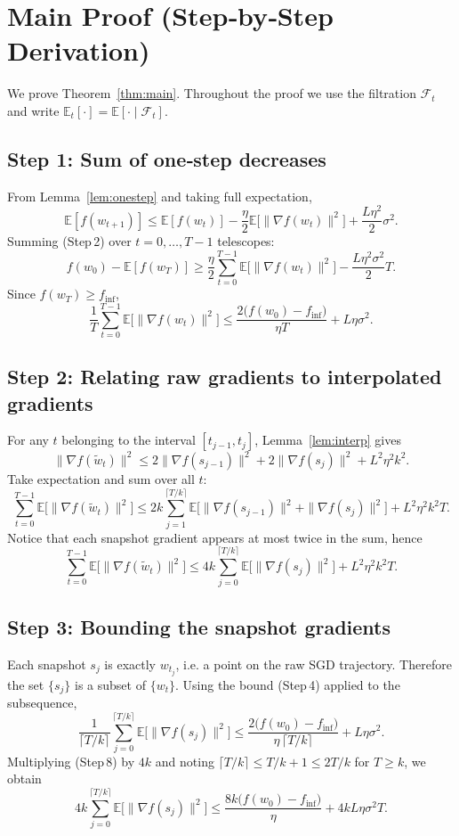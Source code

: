 \documentclass{article}
\newcommand{\E}{\mathbb{E}}
\theoremstyle{definition}
\begin{document}
\section*{Main Proof (Step‑by‑Step Derivation)}
We prove Theorem~\ref{thm:main}.  Throughout the proof we use the filtration
$\mathcal{F}_t$ and write $\E_t[\cdot]=\E[\cdot\mid\mathcal{F}_t]$.

\subsection*{Step 1: Sum of one‑step decreases}
From Lemma~\ref{lem:onestep} and taking full expectation,
\[
\E[f(w_{t+1})]\le \E[f(w_t)]-\frac{\eta}{2}\E\!\big[\|\nabla f(w_t)\|^{2}\big]
+\frac{L\eta^{2}}{2}\sigma^{2}.
\tag{[Step 2]}
\]
Summing (Step 2) over $t=0,\dots,T-1$ telescopes:
\[
f(w_0)-\E[f(w_T)]
\ge \frac{\eta}{2}\sum_{t=0}^{T-1}\E\!\big[\|\nabla f(w_t)\|^{2}\big]
-\frac{L\eta^{2}\sigma^{2}}{2}T .
\tag{[Step 3]}
\]
Since $f(w_T)\ge f_{\inf}$,
\[
\frac{1}{T}\sum_{t=0}^{T-1}\E\!\big[\|\nabla f(w_t)\|^{2}\big]
\le \frac{2\big(f(w_0)-f_{\inf}\big)}{\eta T}
+L\eta\sigma^{2}.
\tag{[Step 4]}
\]

\subsection*{Step 2: Relating raw gradients to interpolated gradients}
For any $t$ belonging to the interval $[t_{j-1},t_j]$, Lemma~\ref{lem:interp}
gives
\[
\|\nabla f(\tilde w_t)\|^{2}
\le 2\|\nabla f(s_{j-1})\|^{2}+2\|\nabla f(s_{j})\|^{2}
+L^{2}\eta^{2}k^{2}.
\tag{[Step 5]}
\]
Take expectation and sum over all $t$:
\[
\sum_{t=0}^{T-1}\E\!\big[\|\nabla f(\tilde w_t)\|^{2}\big]
\le
2k\sum_{j=1}^{\lceil T/k\rceil}\E\!\big[\|\nabla f(s_{j-1})\|^{2}
+\|\nabla f(s_{j})\|^{2}\big]
+L^{2}\eta^{2}k^{2}T .
\tag{[Step 6]}
\]
Notice that each snapshot gradient appears at most twice in the sum,
hence
\[
\sum_{t=0}^{T-1}\E\!\big[\|\nabla f(\tilde w_t)\|^{2}\big]
\le
4k\sum_{j=0}^{\lceil T/k\rceil}\E\!\big[\|\nabla f(s_{j})\|^{2}\big]
+L^{2}\eta^{2}k^{2}T .
\tag{[Step 7]}
\]

\subsection*{Step 3: Bounding the snapshot gradients}
Each snapshot $s_j$ is exactly $w_{t_j}$, i.e. a point on the raw SGD
trajectory.  Therefore the set $\{s_j\}$ is a subset of $\{w_t\}$.  Using
the bound (Step 4) applied to the subsequence,
\[
\frac{1}{\lceil T/k\rceil}\sum_{j=0}^{\lceil T/k\rceil}
\E\!\big[\|\nabla f(s_j)\|^{2}\big]
\le
\frac{2\big(f(w_0)-f_{\inf}\big)}{\eta\,\lceil T/k\rceil}
+L\eta\sigma^{2}.
\tag{[Step 8]}
\]
Multiplying (Step 8) by $4k$ and noting $\lceil T/k\rceil\le T/k+1\le 2T/k$ for
$T\ge k$, we obtain
\[
4k\sum_{j=0}^{\lceil T/k\rceil}
\E\!\big[\|\nabla f(s_j)\|^{2}\big]
\le
\frac{8k\big(f(w_0)-f_{\inf}\big)}{\eta}
+4kL\eta\sigma^{2}T .
\tag{[Step 9]}
\]
\end{document}

